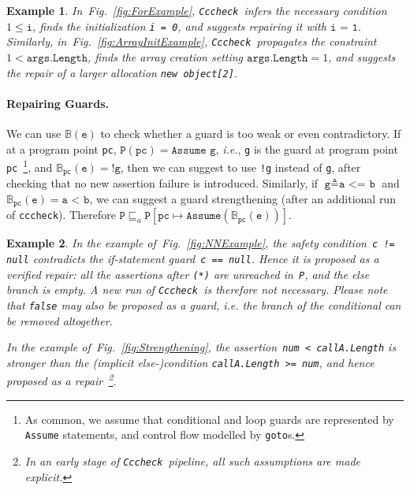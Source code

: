 \documentclass[10pt]{sigplanconf}
\newtheorem{example}{Example}
\newcommand{\refFig}[1]{Fig.~\ref{fig:#1}}
\newcommand{\code}[1]{\texttt{#1}}
\newcommand{\clousot}{\code{cccheck}}
\newcommand{\Clousot}{\code{Cccheck}}
\begin{document}
\begin{example}\normalfont
In~\refFig{ForExample}, \Clousot\ infers the necessary condition $1
\leq \code{i}$, finds the initialization
\code{i = 0}, and suggests repairing it with $\code{i = 1}$.
Similarly, in~\refFig{ArrayInitExample}, \Clousot\ propagates the
constraint $1 < \code{args.Length}$, finds the array creation setting
$\code{args.Length} = 1$, and suggests the repair of a larger
allocation \code{new object[2]}. 
\end{example}

\paragraph{Repairing Guards.}
We can use $\mathbb{B}(\code{e})$ to check whether a guard is too weak
or even contradictory.  If at a program point \code{pc}, $\code{P}(\code{pc})
= \code{Assume g}$, \emph{i.e.}, \code{g} is the guard at program point
\code{pc}~\footnote{As common, we assume that conditional and loop
guards are represented by \code{Assume} statements, and control flow
modelled by \code{goto}s.}, and $\mathbb{B}_\code{pc}(\code{e}) =
\code{!g}$, then we can suggest to use \code{!g} instead of \code{g},
after checking that no new assertion failure is introduced.
Similarly, if $\code{g} \triangleq \code{a <= b}$ and
$\mathbb{B}_\code{pc}(\code{e}) = \code{a < b}$, we can suggest a
guard strengthening (after an additional run of \clousot).  Therefore
$\code{P} \sqsubseteq_a \code{P}[\code{pc} \mapsto
\code{Assume}(\mathbb{B}_\code{pc}(\code{e}))]$.

\begin{example}\normalfont
In the example of~\refFig{NNExample}, the safety condition~\code{c !=
null} contradicts the if-statement guard~\code{c == null}.  Hence it
is proposed as a verified repair: all the assertions after \code{(*)}
are unreached in~\code{P}, and the else branch is empty.  A new run of
\Clousot\ is therefore not necessary.  
Please note that \code{false} may also be proposed as a guard, \emph{i.e.} the branch of the conditional can be removed altogether.


In the example of~\refFig{Strengthening}, the assertion~\code{num < callA.Length} is
stronger than the (implicit else-)condition \code{callA.Length >=
num}, and hence proposed as a repair~\footnote{In an early stage of
\Clousot\ pipeline, all such assumptions are made explicit.}. 
\end{example}
\end{document}
